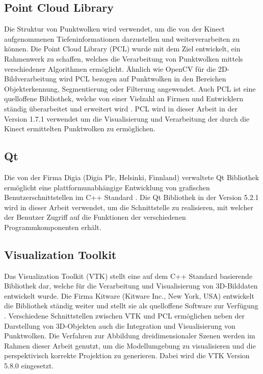 
\subsection{Point Cloud Library}
Die Struktur von Punktwolken wird verwendet, um die von der Kinect aufgenommenen Tiefeninformationen darzustellen und weiterverarbeiten zu können. Die Point Cloud Library (PCL) wurde mit dem Ziel entwickelt, ein Rahmenwerk zu schaffen, welches die Verarbeitung von Punktwolken mittels verschiedener Algorithmen ermöglicht. Ähnlich wie OpenCV für die 2D-Bildverarbeitung wird PCL bezogen auf Punktwolken in den Bereichen Objekterkennung, Segmentierung oder Filterung angewendet. Auch PCL ist eine quelloffene Bibliothek, welche von einer Vielzahl an Firmen und Entwicklern ständig überarbeitet und erweitert wird \cite{PCL}. PCL wird in dieser Arbeit in der Version 1.7.1 verwendet um die Visualisierung und Verarbeitung der durch die Kinect ermittelten Punktwolken zu ermöglichen.


\subsection{Qt}
Die von der Firma Digia (Digia Plc, Helsinki, Finnland) verwaltete Qt Bibliothek ermöglicht eine plattformunabhängige Entwicklung von grafischen Benutzerschnittstellen im C++ Standard \cite{Qt}. Die Qt Bibliothek in der Version 5.2.1 wird in dieser Arbeit verwendet, um die Schnittstelle zu realisieren, mit welcher der Benutzer Zugriff auf die Funktionen der verschiedenen Programmkomponenten erhält.

\subsection{Visualization Toolkit}
\label{chap.vtk}
Das Visualization Toolkit (VTK) stellt eine auf dem C++ Standard basierende Bibliothek dar, welche für die Verarbeitung und Visualisierung von 3D-Bilddaten entwickelt wurde. Die Firma Kitware (Kitware Inc., New York, USA) entwickelt die Bibliothek ständig weiter und stellt sie als quelloffene Software zur Verfügung \cite{VTK}. Verschiedene Schnittstellen zwischen VTK und PCL ermöglichen neben der Darstellung von 3D-Objekten auch die Integration und Visualisierung von Punktwolken. Die Verfahren zur Abbildung dreidimensionaler Szenen werden im Rahmen dieser Arbeit genutzt, um die Modellumgebung zu visualisieren und die perspektivisch korrekte Projektion zu generieren. Dabei wird die VTK Version 5.8.0 eingesetzt.

